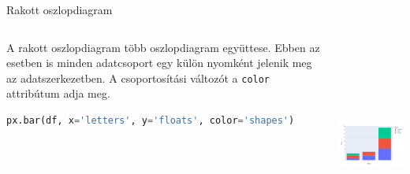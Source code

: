 \documentclass[english, aspectratio=169]{beamer}
\begin{document}
	\begin{frame}[fragile]{Rakott oszlopdiagram}
		\begin{columns}
			\begin{column}{.5\textwidth}
				A rakott oszlopdiagram több oszlopdiagram együttese. Ebben az esetben is minden adatcsoport egy külön nyomként jelenik meg az adatszerkezetben. A csoportosítási változót a \texttt{color} attribútum adja meg. 
				\vspace{0.3cm}
				\begin{lstlisting}[language=python]
px.bar(df, x='letters', y='floats', color='shapes')
				\end{lstlisting}
			\end{column}
			\begin{column}{.5\textwidth}
				\begin{center}
					\includegraphics[width=7cm, height=7cm, keepaspectratio]{images/plots_11.png}
				\end{center}
			\end{column}
		\end{columns}
	\end{frame}
	
\end{document}
